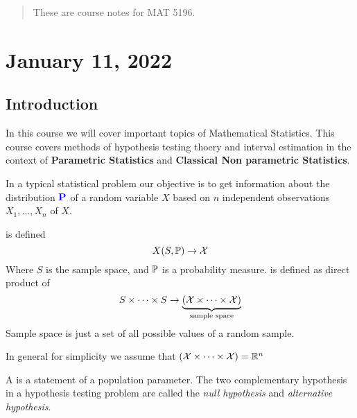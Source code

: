 \begin{abstract}
    These are course notes for MAT 5196.
\end{abstract}

\section{January 11, 2022}
\subsection{Introduction}
In this course we will cover important topics of Mathematical Statistics. This course covers methods of hypothesis testing thoery and interval estimation in the context of \textbf{Parametric Statistics} and \textbf{Classical Non parametric Statistics}.

In a typical statistical problem our objective is to get information about the distribution $\textbf{\color{blue} P}$ of a random variable $X$ based on $n$ independent observations $X_1,...,X_n$ of $X$. 

\begin{definition}
 is defined 
$$
X(S,\mathbb P) \to \mathcal X
$$
Where $S$ is the sample space, and $\mathbb P$ is a probability measure.
 is defined as direct product of 
$$
S \times \cdots \times S \to \underbrace{(\mathcal X \times \cdots \times \mathcal X)}_\text{sample space}
$$
Sample space is just a set of all possible values of a random sample.
\end{definition}
In general for simplicity we assume that $(\mathcal X \times \cdots \times \mathcal X) = \mathbb R^n$

A  is a statement of a population parameter. The two complementary hypothesis in a hypothesis testing problem are called the \textit{null hypothesis} and \textit{alternative hypothesis}.

